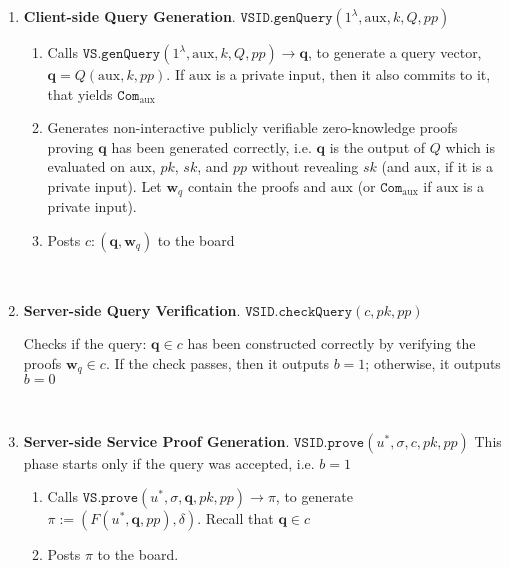 \begin{enumerate}
\

\item\textbf{Client-side Query Generation}\label{VSID::Client-side-QueryGeneration}. $\mathtt{VSID.genQuery}(1^{\lambda},  \text{aux},k,Q,{pp} )$ 
\begin{enumerate}
\item Calls $\mathtt{VS.genQuery}(1^{\lambda}, \text{aux},k,Q,{pp} )\rightarrow \bm{q}$, to generate a query vector, $\bm{q}=Q(\text{aux},k,{pp})$. If $\text{aux}$ is a private input, then it also commits to it,  that yields  $\mathtt{Com}_{\scriptscriptstyle \text{aux}}$
\item Generates non-interactive publicly verifiable zero-knowledge proofs proving $\bm{q}$ has been generated correctly, i.e. $\bm{q}$ is the
output of $Q$ which is evaluated on $\text{aux}$, $pk$, $sk$, and $pp$ without revealing $sk$ (and $\text{aux}$, if it is a private input). Let $\bm{w}_{\scriptscriptstyle q}$ contain the proofs and  $\text{aux}$ (or  $\mathtt{Com}_{\scriptscriptstyle \text{aux}}$ if $\text{aux}$ is a private input).
\item Posts $c:(\bm{q},\bm{w}_{\scriptscriptstyle q})$ to the board 
\end{enumerate}

\

\item\textbf{Server-side Query Verification}. $\mathtt{VSID.checkQuery}(c, pk, {pp})$

Checks if   the query: $\bm{q}\in c$ has been constructed correctly by verifying the proofs  $\bm{w}_{\scriptscriptstyle q}\in c$. If the check passes, then it outputs $b=1$; otherwise, it outputs $b=0$


\

\item\textbf{Server-side Service Proof Generation}. $\mathtt{VSID.prove}(u^{\scriptscriptstyle *},\sigma,c,pk,{pp} )$ This phase starts only if the query was accepted, i.e. $b=1$ 
\begin{enumerate}
\item Calls $\mathtt{VS.prove}(u^{\scriptscriptstyle *},\sigma, \bm{q},pk,{pp})\rightarrow \pi$, to generate $\pi:=(F(u^{\scriptscriptstyle *},\bm{q},{pp}),\delta)$. Recall that $\bm{q}\in c$
\item Posts $\pi$ to the board. 
\end{enumerate}


\end{enumerate}
